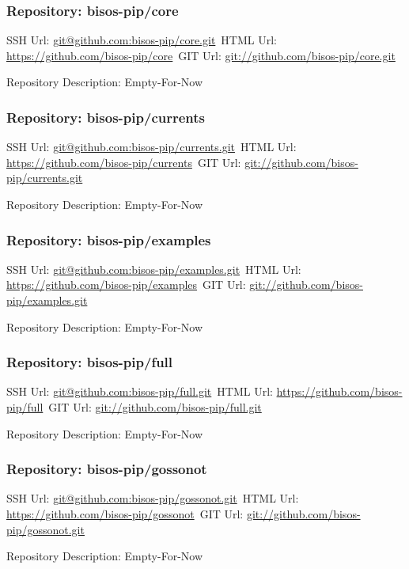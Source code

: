 \subsubsection{Repository: bisos-pip/core}

SSH Url:  \url{git@github.com:bisos-pip/core.git}\
HTML Url: \url{https://github.com/bisos-pip/core}\
GIT Url:  \url{git://github.com/bisos-pip/core.git}

Repository Description: Empty-For-Now

\subsubsection{Repository: bisos-pip/currents}

SSH Url:  \url{git@github.com:bisos-pip/currents.git}\
HTML Url: \url{https://github.com/bisos-pip/currents}\
GIT Url:  \url{git://github.com/bisos-pip/currents.git}

Repository Description: Empty-For-Now

\subsubsection{Repository: bisos-pip/examples}

SSH Url:  \url{git@github.com:bisos-pip/examples.git}\
HTML Url: \url{https://github.com/bisos-pip/examples}\
GIT Url:  \url{git://github.com/bisos-pip/examples.git}

Repository Description: Empty-For-Now

\subsubsection{Repository: bisos-pip/full}

SSH Url:  \url{git@github.com:bisos-pip/full.git}\
HTML Url: \url{https://github.com/bisos-pip/full}\
GIT Url:  \url{git://github.com/bisos-pip/full.git}

Repository Description: Empty-For-Now

\subsubsection{Repository: bisos-pip/gossonot}

SSH Url:  \url{git@github.com:bisos-pip/gossonot.git}\
HTML Url: \url{https://github.com/bisos-pip/gossonot}\
GIT Url:  \url{git://github.com/bisos-pip/gossonot.git}

Repository Description: Empty-For-Now

